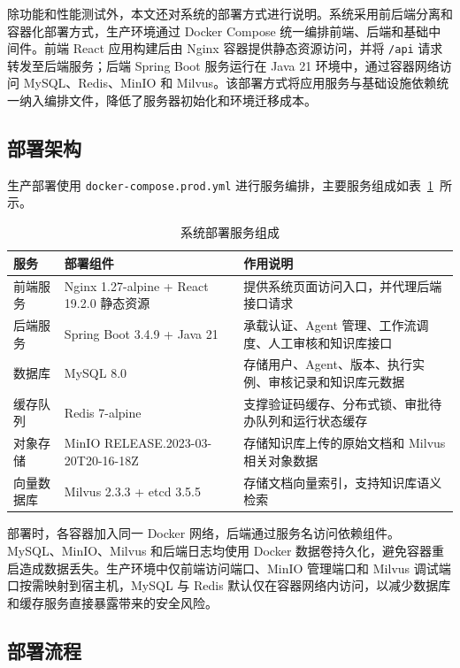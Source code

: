 除功能和性能测试外，本文还对系统的部署方式进行说明。系统采用前后端分离和容器化部署方式，生产环境通过 Docker Compose 统一编排前端、后端和基础中间件。前端 React 应用构建后由 Nginx 容器提供静态资源访问，并将 \texttt{/api} 请求转发至后端服务；后端 Spring Boot 服务运行在 Java 21 环境中，通过容器网络访问 MySQL、Redis、MinIO 和 Milvus。该部署方式将应用服务与基础设施依赖统一纳入编排文件，降低了服务器初始化和环境迁移成本。

\subsection{部署架构}

生产部署使用 \texttt{docker-compose.prod.yml} 进行服务编排，主要服务组成如表~\ref{tab:deploy_services}~所示。

\begin{table}[H]
  \centering
  \caption{系统部署服务组成}
  \label{tab:deploy_services}
  \small
  \begin{tabularx}{\textwidth}{p{2.2cm}p{4.6cm}X}
    \toprule
    服务 & 部署组件 & 作用说明 \\
    \midrule
    前端服务 & Nginx 1.27-alpine + React 19.2.0 静态资源 & 提供系统页面访问入口，并代理后端接口请求 \\
    后端服务 & Spring Boot 3.4.9 + Java 21 & 承载认证、Agent 管理、工作流调度、人工审核和知识库接口 \\
    数据库 & MySQL 8.0 & 存储用户、Agent、版本、执行实例、审核记录和知识库元数据 \\
    缓存队列 & Redis 7-alpine & 支撑验证码缓存、分布式锁、审批待办队列和运行状态缓存 \\
    对象存储 & MinIO RELEASE.2023-03-20T20-16-18Z & 存储知识库上传的原始文档和 Milvus 相关对象数据 \\
    向量数据库 & Milvus 2.3.3 + etcd 3.5.5 & 存储文档向量索引，支持知识库语义检索 \\
    \bottomrule
  \end{tabularx}
\end{table}

部署时，各容器加入同一 Docker 网络，后端通过服务名访问依赖组件。MySQL、MinIO、Milvus 和后端日志均使用 Docker 数据卷持久化，避免容器重启造成数据丢失。生产环境中仅前端访问端口、MinIO 管理端口和 Milvus 调试端口按需映射到宿主机，MySQL 与 Redis 默认仅在容器网络内访问，以减少数据库和缓存服务直接暴露带来的安全风险。

\subsection{部署流程}

